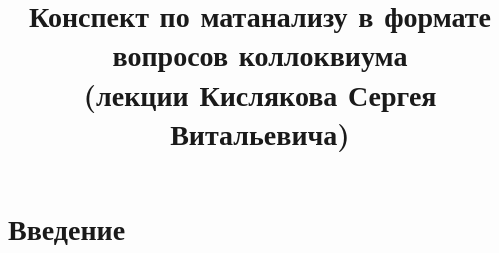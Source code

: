 \documentclass[12pt]{report}
\begin{document}
\renewcommand{\proofname}{Доказательство}

\theoremstyle{plain}
\newtheorem{thm}{Theorem}[section]
\newtheorem*{aks}{Аксиома}[section]
\newtheorem*{lm}{Lemma}
\newtheorem*{st}{Statement}
\newtheorem*{prop}{Properties}

\theoremstyle{definition}
\newtheorem{defn}{Def}
\newtheorem*{ex}{Example}
\newtheorem*{exs}{Examples}
\newtheorem*{cor}{Corollary}
\newtheorem*{name}{Name}

\theoremstyle{remark}
\newtheorem*{rem}{Remain}
\newtheorem*{note}{Note}
\newtheorem*{probl}{Exercise}

\newcommand{\Z}{\mathbb{Z}}
\newcommand{\N}{\mathbb{N}}
\newcommand{\R}{\mathbb{R}}
\newcommand{\Q}{\mathbb{Q}}
\newcommand{\K}{\mathbb{K}}
\newcommand{\Cm}{\mathbb{C}}
\newcommand{\Pm}{\mathbb{P}}
\newcommand{\ilim}{\int\limits}
\newcommand{\slim}{\sum\limits}

\title{Конспект по матанализу в формате вопросов коллоквиума \\ (лекции Кислякова Сергея Витальевича)}                      
\maketitle
\clearpage
\tableofcontents
\clearpage
\chapter{Введение}
\end{document}
